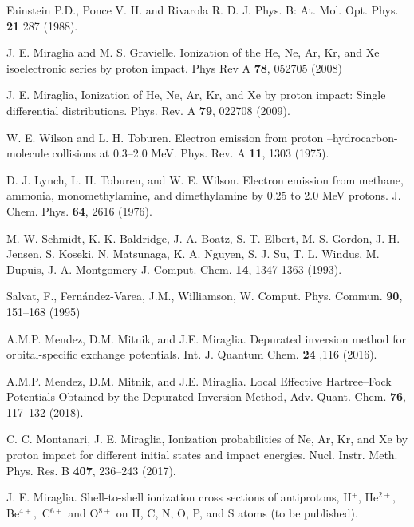 \documentclass[10pt,showpacs,twocolumn]{revtex4}
\begin{document}
\begin{thebibliography}{}

Fainstein P.D., Ponce V. H. and Rivarola R. D. 
J. Phys. B: At. Mol. Opt. Phys. \textbf{21} 287 (1988).

J. E. Miraglia and M. S. Gravielle. Ionization of the
He, Ne, Ar, Kr, and Xe isoelectronic series by proton impact. 
Phys Rev A \textbf{78}, 052705 (2008)

J. E. Miraglia, Ionization of He, Ne, Ar, Kr, and Xe
by proton impact: Single differential distributions. 
Phys. Rev. A \textbf{79}, 022708 (2009).

W. E. Wilson and L. H. Toburen. Electron emission from
proton --hydrocarbon-molecule collisions at 0.3--2.0 MeV. 
Phys. Rev. A \textbf{11}, 1303 (1975).

D. J. Lynch, L. H. Toburen, and W. E. Wilson. Electron
emission from methane, ammonia, monomethylamine, and dimethylamine by 0.25
to 2.0 MeV protons. 
J. Chem. Phys. \textbf{64}, 2616 (1976).

M. W. Schmidt, K. K. Baldridge, J. A. Boatz, S. T. Elbert, M. S. Gordon, 
J. H. Jensen, S. Koseki, N. Matsunaga, K. A. Nguyen, S. J. Su, T. L. Windus, 
M. Dupuis, J. A. Montgomery 
J. Comput. Chem. \textbf{14}, 1347-1363 (1993).


Salvat, F., Fern\'andez-Varea, J.M., Williamson, W.
Comput. Phys. Commun. \textbf{90}, 151--168 (1995)

A.M.P. Mendez, D.M. Mitnik, and J.E. Miraglia.
Depurated inversion method for orbital-specific exchange potentials. 
Int. J. Quantum Chem. \textbf{24} ,116 (2016).

A.M.P. Mendez, D.M. Mitnik, and J.E. Miraglia. 
Local Effective Hartree--Fock Potentials Obtained by the Depurated 
Inversion Method,
Adv. Quant. Chem. \textbf{76}, 117--132 (2018).

C. C. Montanari, J. E. Miraglia,
Ionization probabilities of Ne, Ar, Kr, and Xe by
proton impact for different initial states and impact energies. 
Nucl. Instr. Meth. Phys. Res. B \textbf{407}, 236--243 (2017).

J. E. Miraglia. Shell-to-shell ionization cross
sections of antiprotons, H$^{+}$, He$^{2+},$ Be$^{4+},$ C$^{6+}$ and 
O$^{8+}$ on H, C, N, O, P, and S atoms (to be published).


\end{thebibliography}
\end{document}
